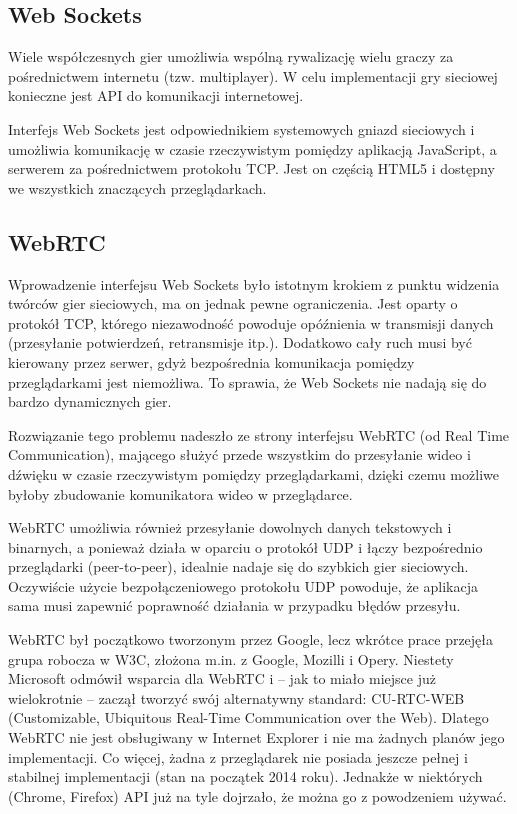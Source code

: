 \subsection{Web Sockets}
\label{ssec:webSockets}

Wiele współczesnych gier umożliwia wspólną rywalizację wielu graczy za pośrednictwem internetu
(tzw. multiplayer). W celu implementacji gry sieciowej konieczne jest API do komunikacji
internetowej.

Interfejs Web Sockets jest odpowiednikiem systemowych gniazd sieciowych i umożliwia komunikację
w czasie rzeczywistym pomiędzy aplikacją JavaScript, a serwerem za pośrednictwem protokołu TCP.
Jest on częścią HTML5 i dostępny we wszystkich znaczących przeglądarkach.

\subsection{WebRTC}
\label{ssec:webrtc}

Wprowadzenie interfejsu Web Sockets było istotnym krokiem z punktu widzenia twórców gier
sieciowych, ma on jednak pewne ograniczenia. Jest oparty o protokół TCP, którego 
niezawodność powoduje opóźnienia w transmisji danych (przesyłanie potwierdzeń,
retransmisje itp.). Dodatkowo cały ruch musi być kierowany przez serwer, gdyż bezpośrednia
komunikacja pomiędzy przeglądarkami jest niemożliwa. To sprawia, że Web Sockets nie nadają
się do bardzo dynamicznych gier.

Rozwiązanie tego problemu nadeszło ze strony interfejsu WebRTC (od Real Time Communication),
mającego służyć przede wszystkim
do przesyłanie wideo i dźwięku w czasie rzeczywistym pomiędzy przeglądarkami, dzięki czemu
możliwe byłoby zbudowanie komunikatora wideo w przeglądarce.

WebRTC umożliwia również przesyłanie dowolnych danych tekstowych i binarnych, a ponieważ
działa w oparciu o protokół UDP i łączy bezpośrednio przeglądarki (peer-to-peer), idealnie
nadaje się do szybkich gier sieciowych. Oczywiście użycie  bezpołączeniowego protokołu UDP
powoduje, że aplikacja sama musi zapewnić poprawność działania w przypadku błędów przesyłu. 

WebRTC był początkowo tworzonym przez Google, lecz wkrótce prace przejęła grupa robocza w W3C,
złożona m.in. z Google, Mozilli i Opery. Niestety Microsoft odmówił wsparcia dla WebRTC i  -- jak
to miało miejsce już wielokrotnie -- zaczął tworzyć swój alternatywny standard: CU-RTC-WEB
(Customizable, Ubiquitous Real-Time Communication over the Web). Dlatego WebRTC nie jest
obsługiwany w Internet Explorer i nie ma żadnych planów jego implementacji. Co więcej,
żadna z przeglądarek nie posiada jeszcze pełnej i stabilnej implementacji (stan na
początek 2014 roku). Jednakże w niektórych (Chrome, Firefox) API już na tyle dojrzało, że
można go z powodzeniem używać.

